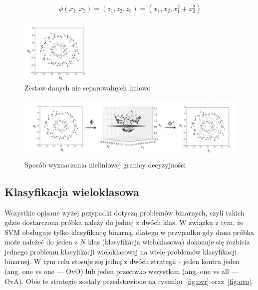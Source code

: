 \begin{equation}
    \begin{aligned}
        \phi(x_1, x_2) = (z_1, z_2, z_3) = (x_1, x_2, x_1^2 + x_2^2)
    \end{aligned}
    \label{eq:przykladowy_kernel}
\end{equation}

\begin{figure}[H]
    \centering
    \includegraphics[width=0.3\textwidth]{images/dane_nie_separowalne_liniowo}
    \caption{  Zestaw danych nie separowalnych liniowo }
    \label{fig:dane_nie_separowalne_liniowo}
\end{figure}

\begin{figure}[H]
    \centering
    \includegraphics[width=1\textwidth]{images/wyniki_mapowan}
    \caption{ Sposób wyznaczania nieliniowej granicy decyzyjności }
    \label{fig:wyniki_mapowan}
\end{figure}

\pagebreak

\subsection{Klasyfikacja wieloklasowa}

Wszystkie opisane wyżej przypadki dotyczą problemów binarnych,
czyli takich gdzie dostarczona próbka należy do jednej z dwóch klas.
W związku z tym, że SVM obsługuje tylko klasyfikację binarną, dlatego w przypadku
gdy dana próbka może należeć do jeden z $N$ klas (klasyfikacja wieloklasowa)
dokonuje się rozbicia jednego problemu klasyfikacji wieloklasowej na wiele problemów klasyfikacji binarnej.
W tym celu stosuje się jedną z dwóch strategii - jeden kontra jeden (ang. one vs one --- OvO)
lub jeden przeciwko wszystkim (ang. one vs all --- OvA).
Obie te strategie zostały przedstawione na rysunku~\ref{fig:ovr} oraz~\ref{fig:ovo}.


